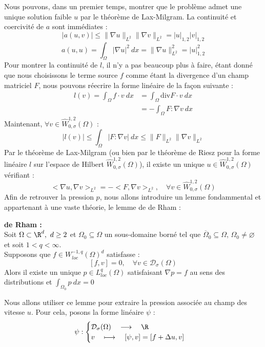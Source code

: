 Nous pouvons, dans un premier temps, montrer que le problème admet une unique solution faible $u$ par le théorème de Lax-Milgram.
La continuité et coercivité de $a$ sont immédiates :
$$|a(u,v)| \leq \|\nabla u\|_{L^2}\|\nabla v\|_{L^2} = |u|_{1,2}|v|_{1,2}$$
$$a(u,u) = \int_{\Omega} |\nabla u|^2 \ dx = \|\nabla u\|^2_{L^2} = |u|_{1,2}^2 $$
Pour montrer la continuité de $l$, il n'y a pas beaucoup plus à faire, étant donné que nous choisissons le terme source $f$ comme étant la divergence d'un champ matriciel $F$, nous pouvons réecrire la forme linéaire de la façon suivante :
\begin{align*}
    l(v) = \int_{\Omega} f \cdot v \ dx &= \int_{\Omega} \text{div} F \cdot v \ dx \\
    &= - \int_{\Omega} F : \nabla v \ dx
\end{align*}
Maintenant, $\forall v \in \widehat{W}_{0,\sigma}^{1,2}(\Omega)$ :
$$|l(v)| \leq \int_{\Omega} |F : \nabla v| \ dx \leq \|F\|_{L^2}\|\nabla v\|_{L^2} $$
Par le théorème de Lax-Milgram \big(ou bien par le théorème de Riesz pour la forme linéaire $l$ sur l'espace de Hilbert $\widehat{W}^{1,2}_{0,\sigma}(\Omega)$\big), il existe un unique $u \in \widehat{W}_{0,\sigma}^{1,2}(\Omega)$ vérifiant :
$$ \big<\nabla u, \nabla v\big>_{L^2} = - \big< F, \nabla v \big>_{L^2} , \quad \forall v \in \widehat{W}_{0,\sigma}^{1,2}(\Omega)$$
Afin de retrouver la pression $p$, nous allons introduire un lemme fondammental et appartenant à une vaste théorie, le lemme de de Rham :
\begin{lemmabox}
    \begin{lemma}
        \textbf{de Rham :}\\
        Soit $\Omega \subset \R^d, \ d \geq 2$ et $\Omega_0 \subseteq \Omega$ un sous-domaine borné tel que $\overline{\Omega}_0 \subseteq \Omega$, $\Omega_0 \neq \varnothing$ et soit $1 < q < \infty$. \\
        Supposons que $f \in W^{-1,q}_{loc}(\Omega)^d$ satisfasse :
        $$ [f,v] = 0, \quad \forall v \in \mathcal{D}_{\sigma}(\Omega) $$
        \vspace{1em}
        Alors il existe un unique $p \in L^q_{loc}(\Omega)$ satisfaisant $\nabla p = f$ au sens des distributions et $\displaystyle \int_{\Omega_0} p \ dx = 0$
    \end{lemma}
\end{lemmabox}
Nous allons utiliser ce lemme pour extraire la pression associée au champ des vitesse $u$. Pour cela, posons la forme linéaire $\psi$ :
$$ \psi : 
\begin{cases}
    \mathcal{D}_{\sigma}(\Omega) \quad \longrightarrow \quad \R \\
    v \quad \longmapsto \quad [\psi,v] = [f + \Delta u,v]
\end{cases} $$
